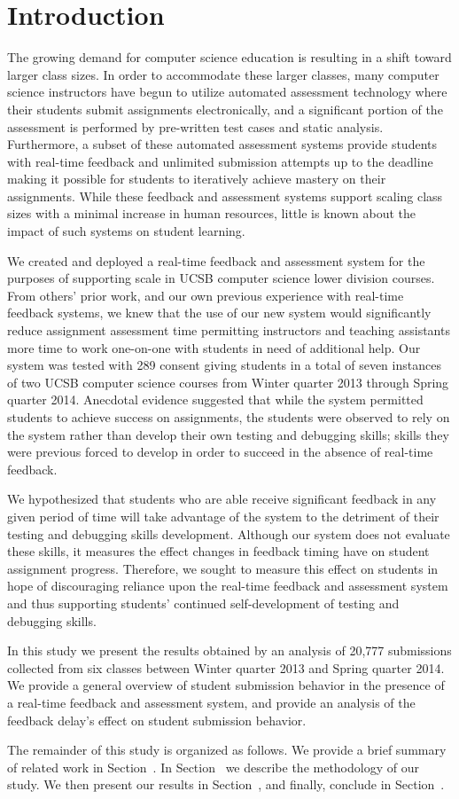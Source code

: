 \section{Introduction}
The growing demand for computer science education is resulting in a shift
toward larger class sizes. In order to accommodate these larger classes, many
computer science instructors have begun to utilize automated assessment
technology where their students submit assignments electronically, and a
significant portion of the assessment is performed by pre-written test cases
and static analysis. Furthermore, a subset of these automated assessment
systems provide students with real-time feedback and unlimited submission
attempts up to the deadline making it possible for students to iteratively
achieve mastery on their assignments. While these feedback and assessment
systems support scaling class sizes with a minimal increase in human resources,
little is known about the impact of such systems on student learning.

We created and deployed a real-time feedback and assessment system for the
purposes of supporting scale in UCSB computer science lower division
courses. From others' prior work, and our own previous experience with
real-time feedback systems, we knew that the use of our new system would
significantly reduce assignment assessment time permitting instructors and
teaching assistants more time to work one-on-one with students in need of
additional help. Our system was tested with 289 consent giving students in a
total of seven instances of two UCSB computer science courses from Winter
quarter 2013 through Spring quarter 2014. Anecdotal evidence suggested that
while the system permitted students to achieve success on assignments, the
students were observed to rely on the system rather than develop their own
testing and debugging skills; skills they were previous forced to develop in
order to succeed in the absence of real-time feedback.

We hypothesized that students who are able receive significant feedback in any
given period of time will take advantage of the system to the detriment of
their testing and debugging skills development. Although our system does not
evaluate these skills, it measures the effect changes in feedback timing have
on student assignment progress. Therefore, we sought to measure this effect on
students in hope of discouraging reliance upon the real-time feedback and
assessment system and thus supporting students' continued self-development of
testing and debugging skills.

In this study we present the results obtained by an analysis of 20,777
submissions collected from six classes between Winter quarter 2013 and Spring
quarter 2014. We provide a general overview of student submission behavior in
the presence of a real-time feedback and assessment system, and provide an
analysis of the feedback delay's effect on student submission behavior.

The remainder of this study is organized as follows. We provide a brief summary
of related work in Section~. In
Section~ we describe the methodology of our study. We
then present our results in Section~, and finally,
conclude in Section~.
